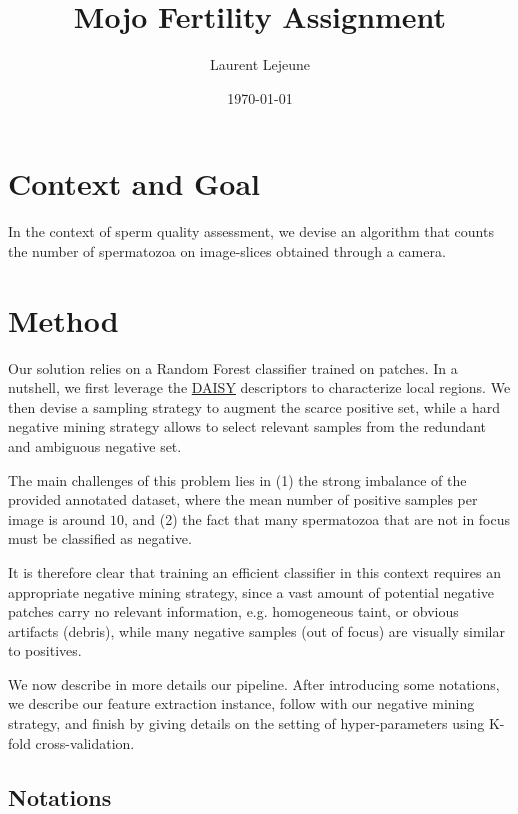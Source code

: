\documentclass[11pt]{article}
\author{Laurent Lejeune}
\date{\today}
\title{Mojo Fertility Assignment}
\begin{document}
\maketitle

\section{Context and Goal}
\label{sec:org16221ae}

In the context of sperm quality assessment, we devise an algorithm that counts the number of spermatozoa
on image-slices obtained through a camera.


\section{Method}
\label{sec:orgd52ff51}

Our solution relies on a Random Forest classifier trained on patches.
In a nutshell, we first leverage the \href{https://www.epfl.ch/labs/cvlab/software/descriptors-and-keypoints/daisy/}{DAISY} descriptors to characterize local regions.
We then devise a sampling strategy to augment the scarce positive set, while a hard negative mining strategy allows to select relevant samples from the redundant and ambiguous
negative set.

The main challenges of this problem lies in (1) the strong imbalance of the provided annotated dataset, where the mean number of positive samples per image is around \(10\), and (2) the fact that many spermatozoa that are not
in focus must be classified as negative.

It is therefore clear that training an efficient classifier in this context requires an appropriate
negative mining strategy, since a vast amount of potential negative patches carry no relevant information, e.g.
homogeneous taint, or obvious artifacts (debris), while many negative samples (out of focus) are visually similar to
positives.

We now describe in more details our pipeline.
After introducing some notations, we describe our feature extraction instance, follow with
our negative mining strategy, and finish by giving details on the setting of hyper-parameters using K-fold cross-validation.


\subsection{Notations}
\label{sec:org2a7cc11}
\end{document}
